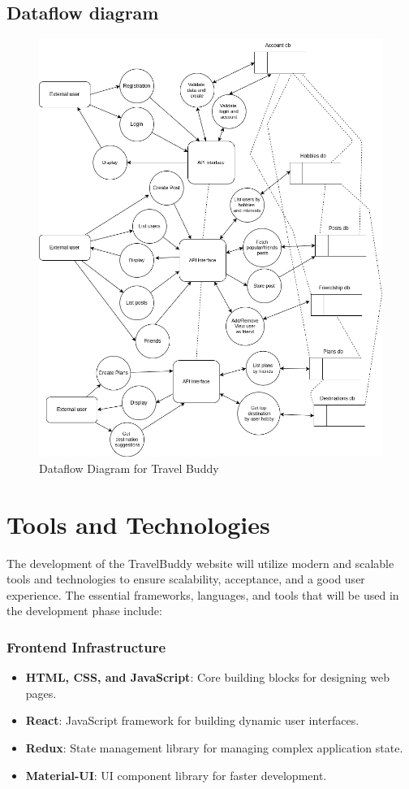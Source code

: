 \documentclass[12pt,a4paper]{report}
\begin{document}
\section{Dataflow diagram}
\begin{figure}[H]
    \centering
    \includegraphics[scale=0.6, keepaspectratio]{figures/dataflow.png}
    \caption{Dataflow Diagram for Travel Buddy}
    \label{fig:dataflow}
\end{figure}

\chapter{Tools and Technologies}

The development of the TravelBuddy website will utilize modern and scalable tools and technologies to ensure scalability, acceptance, and a good user experience. The essential frameworks, languages, and tools that will be used in the development phase include:

\subsection{Frontend Infrastructure}
\begin{itemize}
    \item \textbf{HTML, CSS, and JavaScript}: Core building blocks for designing web pages.
    \item \textbf{React}: JavaScript framework for building dynamic user interfaces.
    \item \textbf{Redux}: State management library for managing complex application state.
    \item \textbf{Material-UI}: UI component library for faster development.
\end{itemize}
\end{document}
